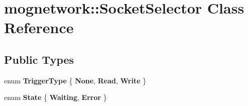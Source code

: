 \hypertarget{classmognetwork_1_1_socket_selector}{\section{mognetwork\-:\-:Socket\-Selector Class Reference}
\label{classmognetwork_1_1_socket_selector}
}
\subsection*{Public Types}
\begin{DoxyCompactItemize}
\item 
enum {\bfseries Trigger\-Type} \{ {\bfseries None}, 
{\bfseries Read}, 
{\bfseries Write}
 \}
\item 
enum {\bfseries State} \{ {\bfseries Waiting}, 
{\bfseries Error}
 \}
\end{DoxyCompactItemize}
